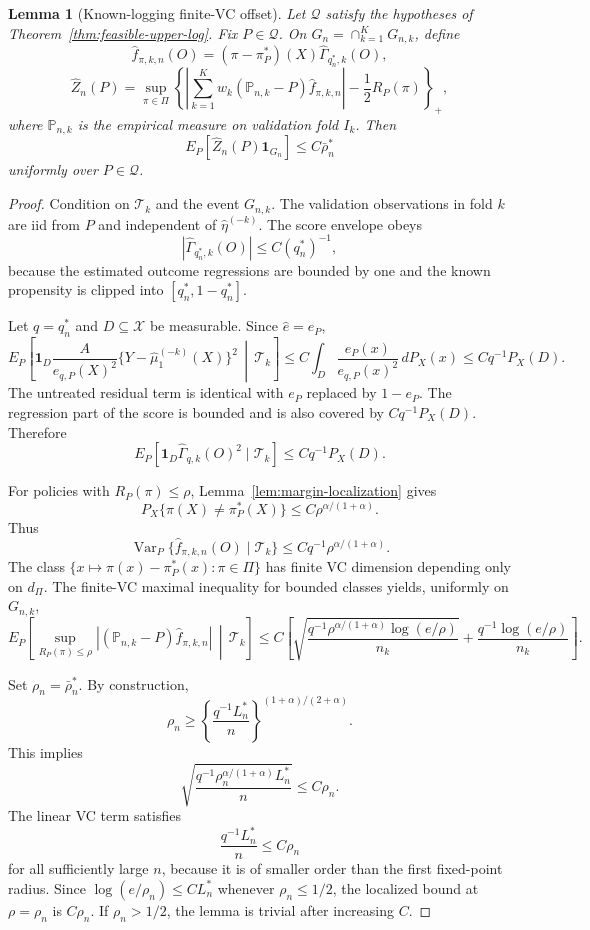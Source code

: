 \documentclass[11pt]{article}
\newcommand{\one}{\mathbf{1}}
\theoremstyle{definition}
\theoremstyle{plain}
\newtheorem{lemma}{Lemma}
\theoremstyle{remark}
\begin{document}
\begin{lemma}[Known-logging finite-VC offset]\label{lem:feasible-vc-offset}
Let \(\mathcal Q\) satisfy the hypotheses of
Theorem~\ref{thm:feasible-upper-log}.  Fix \(P\in\mathcal Q\).  On
\(G_n=\cap_{k=1}^K G_{n,k}\), define
\[
\widehat f_{\pi,k,n}(O)=(\pi-\pi_P^*)(X)\widehat\Gamma_{q_n^*,k}(O),
\]
\[
\widehat Z_n(P)=
\sup_{\pi\in\Pi}
\left\{
\left|\sum_{k=1}^K w_k
(\mathbb P_{n,k}-P)\widehat f_{\pi,k,n}\right|
-\frac12R_P(\pi)
\right\}_+,
\]
where \(\mathbb P_{n,k}\) is the empirical measure on validation fold
\(I_k\).  Then
\[
E_P[\widehat Z_n(P)\one_{G_n}]
\le C\bar\rho_n^*
\]
uniformly over \(P\in\mathcal Q\).
\end{lemma}
\begin{proof}
Condition on \(\mathcal T_k\) and the event \(G_{n,k}\).  The validation
observations in fold \(k\) are iid from \(P\) and independent of
\(\widehat\eta^{(-k)}\).  The score envelope obeys
\[
|\widehat\Gamma_{q_n^*,k}(O)|\le C(q_n^*)^{-1},
\]
because the estimated outcome regressions are bounded by one and the known
propensity is clipped into \([q_n^*,1-q_n^*]\).

Let \(q=q_n^*\) and \(D\subseteq\mathcal X\) be measurable.  Since
\(\widehat e=e_P\),
\[
E_P\!\left[
\one_D\frac{A}{e_{q,P}(X)^2}\{Y-\widehat\mu_1^{(-k)}(X)\}^2
\,\middle|\,\mathcal T_k\right]
\le
C\int_D \frac{e_P(x)}{e_{q,P}(x)^2}\,dP_X(x)
\le Cq^{-1}P_X(D).
\]
The untreated residual term is identical with \(e_P\) replaced by
\(1-e_P\).  The regression part of the score is bounded and is also covered
by \(Cq^{-1}P_X(D)\).  Therefore
\[
E_P[\one_D\widehat\Gamma_{q,k}(O)^2\mid\mathcal T_k]
\le Cq^{-1}P_X(D).
\]

For policies with \(R_P(\pi)\le\rho\), Lemma~\ref{lem:margin-localization}
gives
\[
P_X\{\pi(X)\ne\pi_P^*(X)\}\le C\rho^{\alpha/(1+\alpha)}.
\]
Thus
\[
\operatorname{Var}_P\{\widehat f_{\pi,k,n}(O)\mid\mathcal T_k\}
\le
Cq^{-1}\rho^{\alpha/(1+\alpha)}.
\]
The class \(\{x\mapsto \pi(x)-\pi_P^*(x):\pi\in\Pi\}\) has finite VC
dimension depending only on \(d_\Pi\).  The finite-VC maximal inequality for
bounded classes yields, uniformly on \(G_{n,k}\),
\[
E_P\!\left[
\sup_{R_P(\pi)\le\rho}
|(\mathbb P_{n,k}-P)\widehat f_{\pi,k,n}|
\,\middle|\,\mathcal T_k\right]
\le C\left[
\sqrt{
\frac{
q^{-1}\rho^{\alpha/(1+\alpha)}
\log(e/\rho)}
{n_k}}
+
\frac{q^{-1}\log(e/\rho)}{n_k}
\right].
\]

Set \(\rho_n=\bar\rho_n^*\).  By construction,
\[
\rho_n
\ge
\left\{\frac{q^{-1}L_n^*}{n}\right\}^{(1+\alpha)/(2+\alpha)}.
\]
This implies
\[
\sqrt{\frac{q^{-1}\rho_n^{\alpha/(1+\alpha)}L_n^*}{n}}
\le C\rho_n.
\]
The linear VC term satisfies
\[
\frac{q^{-1}L_n^*}{n}
\le C\rho_n
\]
for all sufficiently large \(n\), because it is of smaller order than the
first fixed-point radius.  Since
\(\log(e/\rho_n)\le C L_n^*\) whenever \(\rho_n\le1/2\), the localized bound
at \(\rho=\rho_n\) is \(C\rho_n\).  If \(\rho_n>1/2\), the lemma is trivial
after increasing \(C\).


\end{proof}
\end{document}

